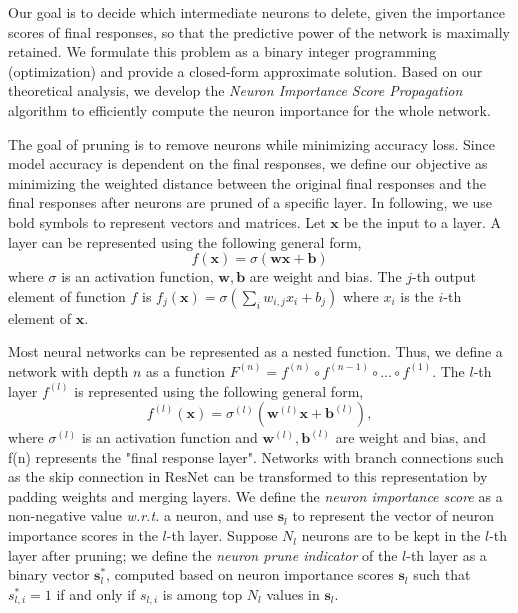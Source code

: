 \documentclass[10pt,twocolumn,letterpaper]{article}
\newtheorem{definition}[theorem]{Definition}
\def\mb{\mathbf}
\def\wrt{\emph{w.r.t.} }
\begin{document}
Our goal is to decide which intermediate neurons to delete, given the importance scores of final responses, so that the predictive power of the network is maximally retained. We formulate this problem as a binary integer programming (optimization) and provide a closed-form approximate solution. Based on our theoretical analysis, we develop the \textit{Neuron Importance Score Propagation} algorithm to efficiently compute the neuron importance for the whole network.

The goal of pruning is to remove neurons while minimizing accuracy loss. Since model accuracy is dependent on the final responses,
we define our objective as minimizing the weighted distance between the original final responses and the final responses after neurons are pruned of a specific layer.  In following, we use bold symbols to represent vectors and matrices.
Let $\mb x$ be the input to a layer. A layer can be represented using the following general form,
\begin{equation}
\label{proof1_objective_2}
f(\mb x)=\sigma(\mb w\mb x+\mathbf b)
\end{equation}
where $\sigma$ is an activation function, $\mb w,\mb b$ are weight and bias. The $j$-th output element of function $f$ is
$f_j(\mb x) = \sigma\left(\sum_{i} w_{i,j}x_i+b_j\right)$
where $x_i$ is the $i$-th element of $\mb x$.
\fi%

Most neural networks can be represented as a nested function. Thus, we define a network with depth $n$ as a function $F^{(n)}=f^{(n)}\circ f^{(n-1)}\circ\dots\circ f^{(1)}$. The $l$-th layer $f^{(l)}$ is represented using the following general form,
\begin{equation}
\label{proof1_objective_2}
f^{(l)}(\mb x)=\sigma^{(l)}(\mb w^{(l)}\mb x+\mathbf b^{(l)}),
\end{equation}
where $\sigma^{(l)}$ is an activation function and $\mb w^{(l)},\mb b^{(l)}$ are weight and bias, and f(n) represents the "final response layer".
Networks with branch connections such as the skip connection in ResNet can be transformed to this representation by padding weights and merging layers. %
We define the \textit{neuron importance score} as a non-negative value \wrt a neuron, and use $\mb s_l$ to represent the vector of neuron importance scores  in the $l$-th layer. Suppose $N_l$ neurons are to be kept in the $l$-th layer after pruning; we define the \textit{neuron prune indicator} of the $l$-th layer as a binary vector $\mb s^*_l$, computed based on neuron importance scores $\mb s_l$ such that $s^*_{l,i}=1$ if and only if $s_{l,i}$ is among top $N_l$ values in $\mb s_l$. 
\end{document}
